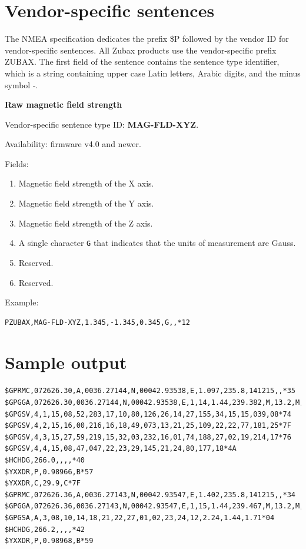 \documentclass{zubaxdoc}
\begin{document}
\section{Vendor-specific sentences}

The NMEA specification dedicates the prefix {\$}P followed by the vendor ID for vendor-specific sentences. All Zubax products use the vendor-specific prefix ZUBAX. The first field of the sentence contains the sentence type identifier, which is a string containing upper case Latin letters, Arabic digits, and the minus symbol -.

\textbf{Raw magnetic field strength}

Vendor-specific sentence type ID: \textbf{MAG-FLD-XYZ}.

Availability: firmware v4.0 and newer.

Fields: 
\begin{enumerate}
\item Magnetic field strength of the X axis.
\item Magnetic field strength of the Y axis.
\item Magnetic field strength of the Z axis.
\item A single character \texttt{G} that indicates that the units of measurement are Gauss.
\item Reserved.
\item Reserved.
\end{enumerate}
Example: 
\begin{verbatim}
PZUBAX,MAG-FLD-XYZ,1.345,-1.345,0.345,G,,*12
\end{verbatim}

\section{Sample output}

\begin{verbatim}
$GPRMC,072626.30,A,0036.27144,N,00042.93538,E,1.097,235.8,141215,,*35
$GPGGA,072626.30,0036.27144,N,00042.93538,E,1,14,1.44,239.382,M,13.2,M,,*5E
$GPGSV,4,1,15,08,52,283,17,10,80,126,26,14,27,155,34,15,15,039,08*74
$GPGSV,4,2,15,16,00,216,16,18,49,073,13,21,25,109,22,22,77,181,25*7F
$GPGSV,4,3,15,27,59,219,15,32,03,232,16,01,74,188,27,02,19,214,17*76
$GPGSV,4,4,15,08,47,047,22,23,29,145,21,24,80,177,18*4A
$HCHDG,266.0,,,,*40
$YXXDR,P,0.98966,B*57
$YXXDR,C,29.9,C*7F
$GPRMC,072626.36,A,0036.27143,N,00042.93547,E,1.402,235.8,141215,,*34
$GPGGA,072626.36,0036.27143,N,00042.93547,E,1,15,1.44,239.467,M,13.2,M,,*5A
$GPGSA,A,3,08,10,14,18,21,22,27,01,02,23,24,12,2.24,1.44,1.71*04
$HCHDG,266.2,,,,*42
$YXXDR,P,0.98968,B*59
\end{verbatim}
\clearpage
\end{document}
